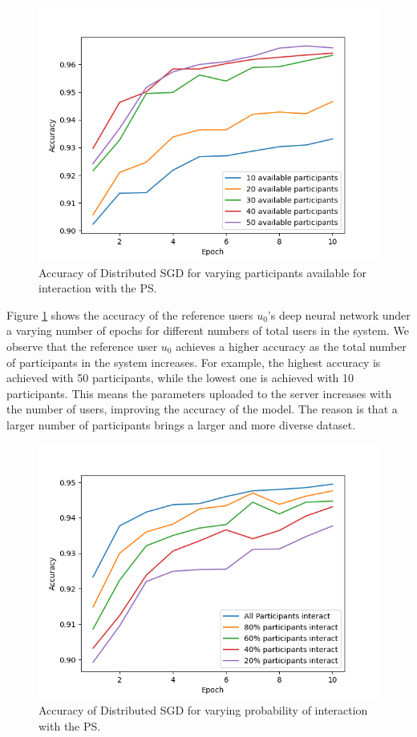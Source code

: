\documentclass[conference]{IEEEtran}
\begin{document}
\begin{figure}[!h]
\centering
\includegraphics[width=\columnwidth, keepaspectratio]{VaryingPoolofParticipants}
\caption{Accuracy of Distributed SGD for varying participants available for interaction with the PS.}
\label{fig:VaryingPoolofParticipants}
\end{figure}

Figure \ref{fig:VaryingPoolofParticipants} shows the accuracy of the reference users $u_0$'s deep neural network under a varying number
of epochs for different numbers of total users in the system. We observe that  the reference user $u_0$ achieves a higher accuracy as
the total number of participants in the system increases. For example, the highest accuracy is achieved with 50 participants, while the
lowest one is achieved with 10 participants. This means the parameters uploaded to the server increases with the number of users, improving the accuracy of the
model. The reason is that a larger  number of participants brings a larger and more diverse dataset. 

\begin{figure}[!h]
\centering
\includegraphics[width=\columnwidth, keepaspectratio]{VaryingProbabilityInteraction}
\caption{Accuracy of Distributed SGD for varying probability of interaction with the PS. }
\label{fig:VaryingProbabilityInteraction}
\end{figure}
\end{document}
